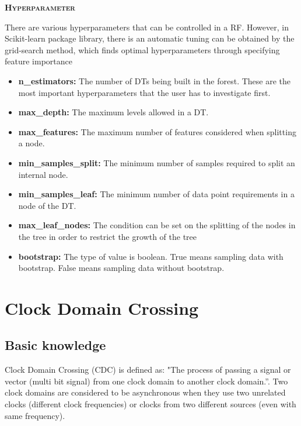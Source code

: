 \documentclass[a4paper, 12pt]{report}
\begin{document}
\textsc{\textbf{Hyperparameter}}\cite{eupgrad}

There are various hyperparameters that can be controlled in a RF. However, in Scikit-learn package library, there is an automatic tuning can be obtained by the grid-search method, which finds optimal hyperparameters through specifying feature importance
\begin{itemize}
\item \textbf{n\_estimators:} The number of DTs being built in the forest. These are the most important hyperparameters that the user has to investigate first.
\item \textbf{max\_depth:} The maximum levels allowed in a DT.
\item \textbf{max\_features:} The maximum number of features considered when splitting a node.
\item \textbf{min\_samples\_split:} The minimum number of samples required to split an internal node.
\item \textbf{min\_samples\_leaf:} The minimum number of data point requirements in a node of the DT.
\item \textbf{max\_leaf\_nodes:} The condition can be set on the splitting of the nodes in the tree in order to restrict the growth of the tree
\item \textbf{bootstrap:} The type of value is boolean. True means sampling data with bootstrap. False means sampling data without bootstrap.
\end{itemize}
\section{Clock Domain Crossing}
\subsection{Basic knowledge} \cite{anysilicon}
Clock Domain Crossing (CDC) is defined as: "The process of passing a signal or vector (multi bit signal) from one clock domain to another clock domain.”. Two clock domains are considered to be asynchronous when they use two unrelated clocks (different clock frequencies) or clocks from two different sources (even with same frequency). 
\end{document}
